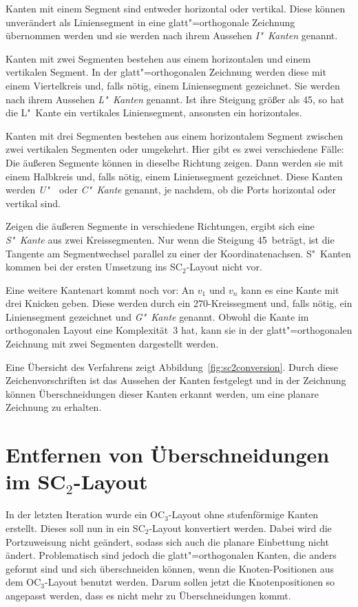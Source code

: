 \documentclass[a4paper]{scrreprt}
\theoremstyle{definition}
\begin{document}
Kanten mit einem Segment sind entweder horizontal oder vertikal. Diese können unverändert als Liniensegment in eine glatt"=orthogonale Zeichnung übernommen werden und sie werden nach ihrem Aussehen \emph{I"~Kanten} genannt.

Kanten mit zwei Segmenten bestehen aus einem horizontalen und einem vertikalen Segment. In der glatt"=orthogonalen Zeichnung werden diese mit einem Viertelkreis und, falls nötig, einem Liniensegment gezeichnet. Sie werden nach ihrem Aussehen \emph{L"~Kanten} genannt. Ist ihre Steigung größer als 45\textdegree, so hat die L"~Kante ein vertikales Liniensegment, ansonsten ein horizontales.

Kanten mit drei Segmenten bestehen aus einem horizontalem Segment zwischen zwei vertikalen Segmenten oder umgekehrt. Hier gibt es zwei verschiedene Fälle: Die äußeren Segmente können in dieselbe Richtung zeigen. Dann werden sie mit einem Halbkreis und, falls nötig, einem Liniensegment gezeichnet. Diese Kanten werden \emph{U"~}~oder \emph{C"~Kante} genannt, je nachdem, ob die Ports horizontal oder vertikal sind.

Zeigen die äußeren Segmente in verschiedene Richtungen, ergibt sich eine \emph{S"~Kante} aus zwei Kreissegmenten. Nur wenn die Steigung 45\textdegree\ beträgt, ist die Tangente am Segmentwechsel parallel zu einer der Koordinatenachsen. S"~Kanten kommen bei der ersten Umsetzung ins SC$_2$-Layout nicht vor.

Eine weitere Kantenart kommt noch vor: An $v_1$ und $v_n$ kann es eine Kante mit drei Knicken geben. Diese werden durch ein 270\textdegree-Kreissegment und, falls nötig, ein Liniensegment gezeichnet und \emph{G"~Kante} genannt. Obwohl die Kante im orthogonalen Layout eine Komplexität~3 hat, kann sie in der glatt"=orthogonalen Zeichnung mit zwei Segmenten dargestellt werden.

Eine Übersicht des Verfahrens zeigt Abbildung~\ref{fig:sc2conversion}. Durch diese Zeichenvorschriften ist das Aussehen der Kanten festgelegt und in der Zeichnung können Überschneidungen dieser Kanten erkannt werden, um eine planare Zeichnung zu erhalten.

\section{Entfernen von Überschneidungen im SC$_2$-Layout}
\label{sec:sc2makePlanarAlgo}

In der letzten Iteration wurde ein OC$_3$-Layout ohne stufenförmige Kanten erstellt. Dieses soll nun in ein SC$_2$-Layout konvertiert werden. Dabei wird die Portzuweisung nicht geändert, sodass sich auch die planare Einbettung nicht ändert. Problematisch sind jedoch die glatt"=orthogonalen Kanten, die anders geformt sind und sich überschneiden können, wenn die Knoten-Positionen aus dem OC$_3$-Layout benutzt werden. Darum sollen jetzt die Knotenpositionen so angepasst werden, dass es nicht mehr zu Überschneidungen kommt.
\end{document}
